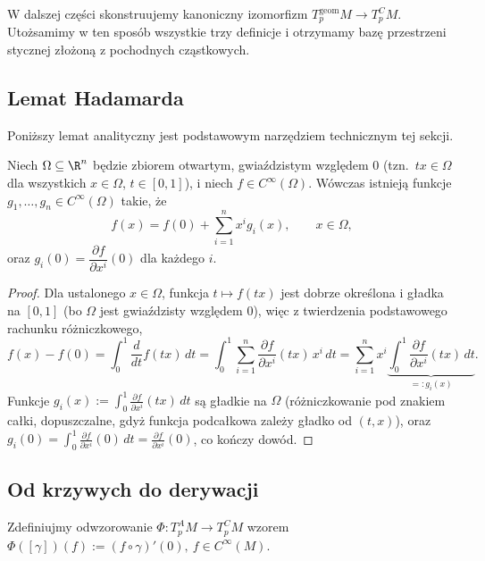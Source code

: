 W dalszej części skonstruujemy kanoniczny izomorfizm
$T_p^{\mathrm{geom}}M\to T_p^CM$. Utożsamimy w ten sposób
wszystkie trzy definicje i otrzymamy bazę przestrzeni
stycznej złożoną z pochodnych cząstkowych.

\subsection*{Lemat Hadamarda}

Poniższy lemat analityczny jest podstawowym narzędziem technicznym tej sekcji.

\begin{lemat}\label{lem:hadamard}
Niech $\Omega\subseteq\R^n$ będzie zbiorem otwartym, gwiaździstym względem $0$ (tzn.\
$tx\in\Omega$ dla wszystkich $x\in\Omega$, $t\in[0,1]$), i niech $f\in C^\infty(\Omega)$.
Wówczas istnieją funkcje $g_1,\dots,g_n\in C^\infty(\Omega)$ takie, że
\[
f(x)=f(0)+\sum_{i=1}^nx^ig_i(x), \qquad x\in\Omega,
\]
oraz $g_i(0)=\dfrac{\partial f}{\partial x^i}(0)$ dla każdego $i$.
\end{lemat}

\begin{proof}
Dla ustalonego $x\in\Omega$, funkcja $t\mapsto f(tx)$ jest dobrze określona i gładka na
$[0,1]$ (bo $\Omega$ jest gwiaździsty względem $0$), więc z twierdzenia podstawowego
rachunku różniczkowego,
\[
f(x)-f(0)=\int_0^1\frac{d}{dt}f(tx)\,dt=\int_0^1\sum_{i=1}^n\frac{\partial f}{\partial x^i}
(tx)\,x^i\,dt=\sum_{i=1}^nx^i\underbrace{\int_0^1\frac{\partial f}{\partial x^i}(tx)\,dt}
_{=:g_i(x)}.
\]
Funkcje $g_i(x):=\int_0^1\frac{\partial f}{\partial x^i}(tx)\,dt$ są gładkie na $\Omega$
(różniczkowanie pod znakiem całki, dopuszczalne, gdyż funkcja podcałkowa zależy gładko od
$(t,x)$), oraz $g_i(0)=\int_0^1\frac{\partial f}{\partial x^i}(0)\,dt=\frac{\partial f}
{\partial x^i}(0)$, co kończy dowód.
\end{proof}

\subsection*{Od krzywych do derywacji}

Zdefiniujmy odwzorowanie $\Phi\colon T_p^AM\to T_p^CM$ wzorem
$\Phi([\gamma])(f):=(f\circ\gamma)'(0), \ f\in C^\infty(M)$.

